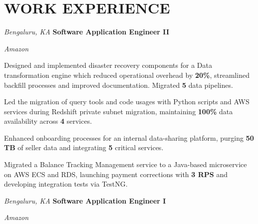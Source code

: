 \section{WORK EXPERIENCE}

\begin{twocolentry}{
    \textit{Bengaluru, KA}}
    \textbf{Software Application Engineer II}
    
    \textit{Amazon}
\end{twocolentry}

\vspace{0.15 cm}
\begin{onecolentry}
    \begin{highlights}
        \item Designed and implemented disaster recovery components for a Data transformation engine which reduced operational overhead by \textbf{20\%}, streamlined backfill processes and improved documentation. Migrated \textbf{5} data pipelines.
        \item Led the migration of query tools and code usages with Python scripts and AWS services during Redshift private subnet migration, maintaining \textbf{100\%} data availability across \textbf{4} services.
        \item Enhanced onboarding processes for an internal data-sharing platform, purging \textbf{50 TB} of seller data and integrating \textbf{5} critical services.
        \item Migrated a Balance Tracking Management service to a Java-based microservice on AWS ECS and RDS, launching payment corrections with \textbf{3 RPS} and developing integration tests via TestNG.
    \end{highlights}
\end{onecolentry}

\vspace{0.15 cm}

\begin{twocolentry}{
    \textit{Bengaluru, KA}}
    \textbf{Software Application Engineer I}
    
    \textit{Amazon}
\end{twocolentry}

\vspace{0.15 cm}

